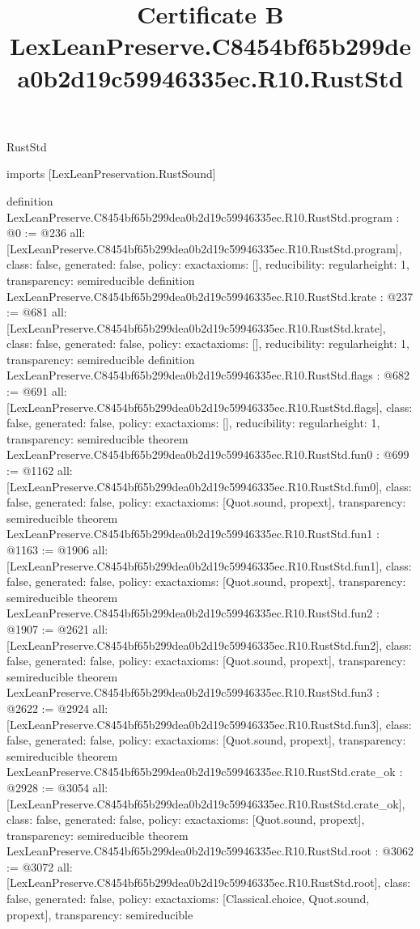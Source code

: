 \begin{lexlean}{RustStd}
\title{Certificate B LexLeanPreserve.C8454bf65b299dea0b2d19c59946335ec.R10.RustStd}
\begin{coremodule}
imports [LexLeanPreservation.RustSound]

definition LexLeanPreserve.C8454bf65b299dea0b2d19c59946335ec.R10.RustStd.program : @0 := @236 {
  all: [LexLeanPreserve.C8454bf65b299dea0b2d19c59946335ec.R10.RustStd.program],
  class: false,
  generated: false,
  policy: exact{axioms: []},
  reducibility: regular{height: 1},
  transparency: semireducible
}
definition LexLeanPreserve.C8454bf65b299dea0b2d19c59946335ec.R10.RustStd.krate : @237 := @681 {
  all: [LexLeanPreserve.C8454bf65b299dea0b2d19c59946335ec.R10.RustStd.krate],
  class: false,
  generated: false,
  policy: exact{axioms: []},
  reducibility: regular{height: 1},
  transparency: semireducible
}
definition LexLeanPreserve.C8454bf65b299dea0b2d19c59946335ec.R10.RustStd.flags : @682 := @691 {
  all: [LexLeanPreserve.C8454bf65b299dea0b2d19c59946335ec.R10.RustStd.flags],
  class: false,
  generated: false,
  policy: exact{axioms: []},
  reducibility: regular{height: 1},
  transparency: semireducible
}
theorem LexLeanPreserve.C8454bf65b299dea0b2d19c59946335ec.R10.RustStd.fun0 : @699 := @1162 {
  all: [LexLeanPreserve.C8454bf65b299dea0b2d19c59946335ec.R10.RustStd.fun0],
  class: false,
  generated: false,
  policy: exact{axioms: [Quot.sound, propext]},
  transparency: semireducible
}
theorem LexLeanPreserve.C8454bf65b299dea0b2d19c59946335ec.R10.RustStd.fun1 : @1163 := @1906 {
  all: [LexLeanPreserve.C8454bf65b299dea0b2d19c59946335ec.R10.RustStd.fun1],
  class: false,
  generated: false,
  policy: exact{axioms: [Quot.sound, propext]},
  transparency: semireducible
}
theorem LexLeanPreserve.C8454bf65b299dea0b2d19c59946335ec.R10.RustStd.fun2 : @1907 := @2621 {
  all: [LexLeanPreserve.C8454bf65b299dea0b2d19c59946335ec.R10.RustStd.fun2],
  class: false,
  generated: false,
  policy: exact{axioms: [Quot.sound, propext]},
  transparency: semireducible
}
theorem LexLeanPreserve.C8454bf65b299dea0b2d19c59946335ec.R10.RustStd.fun3 : @2622 := @2924 {
  all: [LexLeanPreserve.C8454bf65b299dea0b2d19c59946335ec.R10.RustStd.fun3],
  class: false,
  generated: false,
  policy: exact{axioms: [Quot.sound, propext]},
  transparency: semireducible
}
theorem LexLeanPreserve.C8454bf65b299dea0b2d19c59946335ec.R10.RustStd.crate_ok : @2928 := @3054 {
  all: [LexLeanPreserve.C8454bf65b299dea0b2d19c59946335ec.R10.RustStd.crate_ok],
  class: false,
  generated: false,
  policy: exact{axioms: [Quot.sound, propext]},
  transparency: semireducible
}
theorem LexLeanPreserve.C8454bf65b299dea0b2d19c59946335ec.R10.RustStd.root : @3062 := @3072 {
  all: [LexLeanPreserve.C8454bf65b299dea0b2d19c59946335ec.R10.RustStd.root],
  class: false,
  generated: false,
  policy: exact{axioms: [Classical.choice, Quot.sound, propext]},
  transparency: semireducible
}


\end{coremodule}
\end{lexlean}
